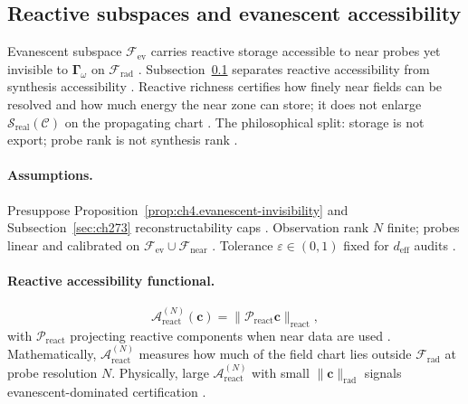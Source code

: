 ﻿\subsection{Reactive subspaces and evanescent accessibility}
\label{sec:ch472}

Evanescent subspace \(\mathcal{F}_{\mathrm{ev}}\) carries reactive storage accessible to near probes yet invisible to \(\boldsymbol{\Gamma}_\omega\)
on \(\mathcal{F}_{\mathrm{rad}}\) \cite{stratton1941,harrington2001}. Subsection~\ref{sec:ch472} separates reactive accessibility from synthesis
accessibility \cite{devaney2004,hansen1988}. Reactive richness certifies how finely near fields can be resolved and how much energy the near zone can
store; it does not enlarge \(\mathcal{S}_{\mathrm{real}}(\mathcal{C})\) on the propagating chart \cite{jackson1999,stratton1941,harrington2001}.
The philosophical split: storage is not export; probe rank is not synthesis rank \cite{devaney2004,hansen1988}.

\paragraph{Assumptions.}
Presuppose Proposition~\ref{prop:ch4.evanescent-invisibility} and Subsection~\ref{sec:ch273} reconstructability caps \cite{stratton1941,harrington2001}.
Observation rank \(N\) finite; probes linear and calibrated on \(\mathcal{F}_{\mathrm{ev}}\cup\mathcal{F}_{\mathrm{near}}\) \cite{devaney2004,harrington2001}.
Tolerance \(\varepsilon\in(0,1)\) fixed for \(d_{\mathrm{eff}}\) audits \cite{hansen1988}.

\paragraph{Reactive accessibility functional.}
\begin{equation}
\label{eq:ch4.reactive-accessibility}
\mathcal{A}_{\mathrm{react}}^{(N)}(\mathbf{c})=\big\|\mathcal{P}_{\mathrm{react}}\mathbf{c}\big\|_{\mathrm{react}},
\end{equation}
with \(\mathcal{P}_{\mathrm{react}}\) projecting reactive components when near data are used \cite{harrington2001,stratton1941}. Mathematically,
\(\mathcal{A}_{\mathrm{react}}^{(N)}\) measures how much of the field chart lies outside \(\mathcal{F}_{\mathrm{rad}}\) at probe resolution \(N\).
Physically, large \(\mathcal{A}_{\mathrm{react}}^{(N)}\) with small \(\|\mathbf{c}\|_{\mathrm{rad}}\) signals evanescent-dominated certification
\cite{devaney2004,jackson1999}.

